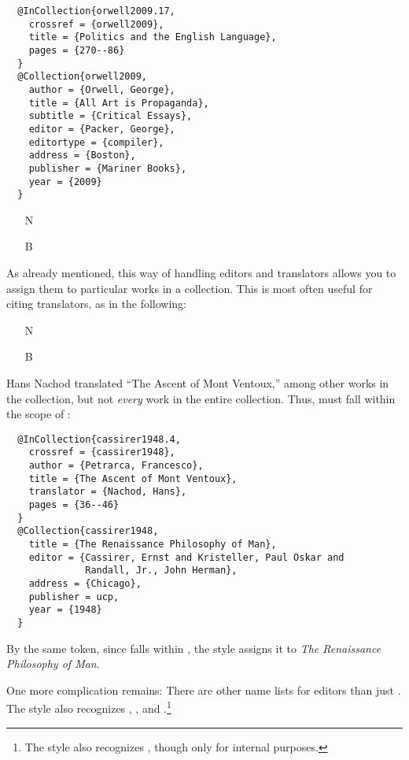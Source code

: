 \documentclass[11pt,letterpaper,oneside]{article}
\begin{document}
\begin{lstlisting}
  @InCollection{orwell2009.17,
    crossref = {orwell2009},
    title = {Politics and the English Language},
    pages = {270--86}
  }
  @Collection{orwell2009,
    author = {Orwell, George},
    title = {All Art is Propaganda},
    subtitle = {Critical Essays},
    editor = {Packer, George},
    editortype = {compiler},
    address = {Boston},
    publisher = {Mariner Books},
    year = {2009}
  }
\end{lstlisting}

\begin{itemize}
\item[N] 

\item[B] 
\end{itemize}

As already mentioned, this way of handling editors and translators
allows you to assign them to particular works in a collection. This is
most often useful for citing translators, as in the following:

\begin{itemize}
\item[N] 

\item[B] 
\end{itemize}

\noindent Hans Nachod translated ``The Ascent of Mont Ventoux,'' among
other works in the collection, but not \textit{every} work in the
entire collection. Thus,  must fall within the
scope of :

\begin{lstlisting}
  @InCollection{cassirer1948.4,
    crossref = {cassirer1948},
    author = {Petrarca, Francesco},
    title = {The Ascent of Mont Ventoux},
    translator = {Nachod, Hans},
    pages = {36--46}
  }
  @Collection{cassirer1948,
    title = {The Renaissance Philosophy of Man},
    editor = {Cassirer, Ernst and Kristeller, Paul Oskar and
              Randall, Jr., John Herman},
    address = {Chicago},
    publisher = ucp,
    year = {1948}
  }
\end{lstlisting}

\noindent By the same token, since  falls within
, the style assigns it to \textit{The Renaissance
Philosophy of Man}.

One more complication remains: There are other name lists for editors
than just . The style also recognizes
, , and
.\footnote{The style also recognizes
, though only for internal purposes.}
\end{document}
